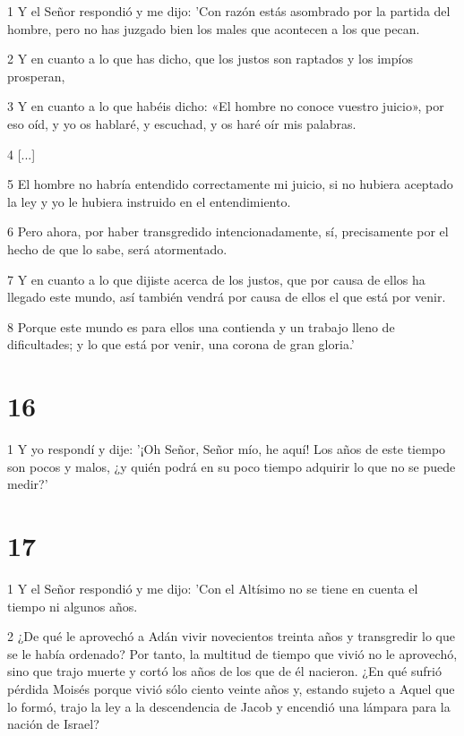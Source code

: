 \par 1 Y el Señor respondió y me dijo: 'Con razón estás asombrado por la partida del hombre, pero no has juzgado bien los males que acontecen a los que pecan.

\par 2 Y en cuanto a lo que has dicho, que los justos son raptados y los impíos prosperan,

\par 3 Y en cuanto a lo que habéis dicho: «El hombre no conoce vuestro juicio», por eso oíd, y yo os hablaré, y escuchad, y os haré oír mis palabras.

\par 4 [...]

\par 5 El hombre no habría entendido correctamente mi juicio, si no hubiera aceptado la ley y yo le hubiera instruido en el entendimiento.

\par 6 Pero ahora, por haber transgredido intencionadamente, sí, precisamente por el hecho de que lo sabe, será atormentado.

\par 7 Y en cuanto a lo que dijiste acerca de los justos, que por causa de ellos ha llegado este mundo, así también vendrá por causa de ellos el que está por venir.

\par 8 Porque este mundo es para ellos una contienda y un trabajo lleno de dificultades; y lo que está por venir, una corona de gran gloria.'

\chapter{16}

\par 1 Y yo respondí y dije: '¡Oh Señor, Señor mío, he aquí! Los años de este tiempo son pocos y malos, ¿y quién podrá en su poco tiempo adquirir lo que no se puede medir?'

\chapter{17}

\par 1 Y el Señor respondió y me dijo: 'Con el Altísimo no se tiene en cuenta el tiempo ni algunos años.

\par 2 ¿De qué le aprovechó a Adán vivir novecientos treinta años y transgredir lo que se le había ordenado? Por tanto, la multitud de tiempo que vivió no le aprovechó, sino que trajo muerte y cortó los años de los que de él nacieron. ¿En qué sufrió pérdida Moisés porque vivió sólo ciento veinte años y, estando sujeto a Aquel que lo formó, trajo la ley a la descendencia de Jacob y encendió una lámpara para la nación de Israel?

